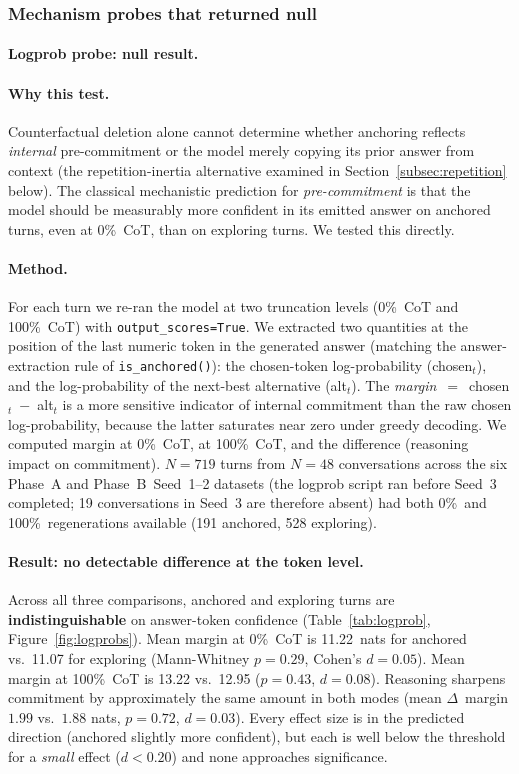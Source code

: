 \documentclass{article}
\begin{document}
\subsubsection*{Mechanism probes that returned null}

\paragraph{Logprob probe: null result.}
\label{subsec:logprobs}

\paragraph{Why this test.}
Counterfactual deletion alone cannot determine whether anchoring
reflects \emph{internal} pre-commitment or the model merely copying
its prior answer from context (the repetition-inertia alternative
examined in Section~\ref{subsec:repetition} below).
The classical mechanistic prediction for \emph{pre-commitment} is
that the model should be measurably more confident in its emitted
answer on anchored turns, even at 0\%~CoT, than on exploring turns.
We tested this directly.

\paragraph{Method.}
For each turn we re-ran the model at two truncation levels
(0\%~CoT and 100\%~CoT) with \texttt{output\_scores=True}.
We extracted two quantities at the position of the last numeric
token in the generated answer (matching the answer-extraction rule
of \texttt{is\_anchored()}):
the chosen-token log-probability (chosen$_t$),
and the log-probability of the next-best alternative (alt$_t$).
The \emph{margin}~$=$~chosen$_t$~$-$~alt$_t$ is a more sensitive
indicator of internal commitment than the raw chosen log-probability,
because the latter saturates near zero under greedy decoding.
We computed margin at 0\%~CoT, at 100\%~CoT, and the difference
(reasoning impact on commitment).
$N=719$ turns from $N=48$ conversations across the six Phase~A and
Phase~B~Seed~1--2 datasets (the logprob script ran before Seed~3
completed; 19 conversations in Seed~3 are therefore absent)
had both 0\%~and 100\%~regenerations available
(191 anchored, 528 exploring).

\paragraph{Result: no detectable difference at the token level.}
Across all three comparisons, anchored and exploring turns are
\textbf{indistinguishable} on answer-token confidence
(Table~\ref{tab:logprob}, Figure~\ref{fig:logprobs}).
Mean margin at 0\%~CoT is 11.22~nats for anchored vs.\ 11.07 for
exploring (Mann-Whitney $p=0.29$, Cohen's $d=0.05$).
Mean margin at 100\%~CoT is 13.22 vs.\ 12.95 ($p=0.43$, $d=0.08$).
Reasoning sharpens commitment by approximately the same amount in
both modes (mean $\Delta$~margin $1.99$ vs.\ $1.88$ nats,
$p=0.72$, $d=0.03$).
Every effect size is in the predicted direction (anchored slightly
more confident), but each is well below the threshold for a
\emph{small} effect ($d<0.20$) and none approaches significance.
\end{document}
